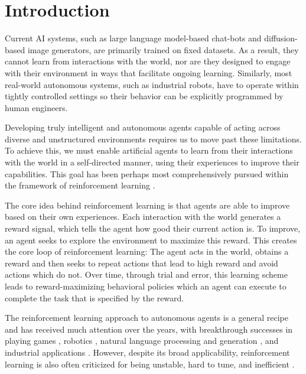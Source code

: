 \chapter{Introduction}

Current AI systems, such as large language model-based chat-bots and diffusion-based image generators, are primarily trained on fixed datasets.
As a result, they cannot learn from interactions with the world, nor are they designed to engage with their environment in ways that facilitate ongoing learning. 
Similarly, most real-world autonomous systems, such as industrial robots, have to operate within tightly controlled settings so their behavior can be explicitly programmed by human engineers.

Developing truly intelligent and autonomous agents capable of acting across diverse and unstructured environments requires us to move past these limitations.
To achieve this, we must enable artificial agents to learn from their interactions with the world in a self-directed manner, using their experiences to improve their capabilities.
This goal has been perhaps most comprehensively pursued within the framework of reinforcement learning \parencite{suttonbook}.

The core idea behind reinforcement learning is that agents are able to improve based on their own experiences.
Each interaction with the world generates a reward signal, which tells the agent how good their current action is.
To improve, an agent seeks to explore the environment to maximize this reward.
This creates the core loop of reinforcement learning: The agent acts in the world, obtains a reward and then seeks to repeat actions that lead to high reward and avoid actions which do not.
Over time, through trial and error, this learning scheme leads to reward-maximizing behavioral policies which an agent can execute to complete the task that is specified by the reward.

The reinforcement learning approach to autonomous agents is a general recipe and has received much attention over the years, with breakthrough successes in playing games \parencite{dqn,silver2016mastering}, robotics \parencite{Hwangbo2019learning,kaufmann2023champion,smith2023demonstrating}, natural language processing and generation \parencite{ouyang2022training,rafailov2023direct,bi2024deepseek}, and industrial applications \parencite{degrave2022magnetic}.
However, despite its broad applicability, reinforcement learning is also often criticized for being unstable, hard to tune, and inefficient \parencite{irpan2018deep,henderson2018deep,patterson2024empirical}.

